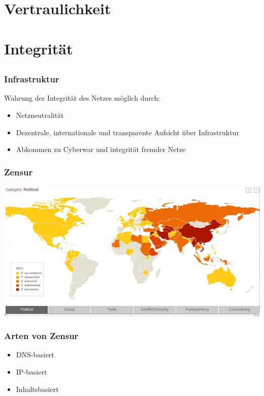 \documentclass[12pt]{beamer}
\begin{document}
\section{Vertraulichkeit}
\subsection{}

\section{Integrität}
\subsection{}

\begin{frame}
    \frametitle{Infrastruktur}
    Wahrung der Integrität des Netzes möglich durch:
    \begin{itemize}
      \item<1-> Netzneutralität
      \item<2-> Dezentrale, internationale und transparente Aufsicht über Infrastruktur
      \item<3-> Abkommen zu Cyberwar und integrität fremder Netze
    \end{itemize}
\end{frame}

\begin{frame}
    \frametitle{Zensur}
    \includegraphics[height=0.7\textheight]{img/zensur-guardian.jpg}
\end{frame}

\begin{frame}
    \frametitle{Arten von Zensur}
    \begin{itemize}
      \item<1-> DNS-basiert
      \item<2-> IP-basiert
      \item<3-> Inhaltsbasiert
    \end{itemize}
\end{frame}
\end{document}
